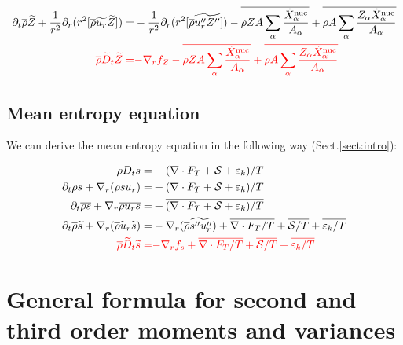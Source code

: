 \documentclass[10pt,paper=a4]{report}
\newcommand{\eht}{\overline}
\newcommand{\fht}{\widetilde}
\begin{document}
\begin{align}
\partial_t \overline{\rho} \fht{Z}  +\frac{1}{r^{2}} \partial_{r}(r^{2} [\eht{\rho} \fht{u_{r}} \fht{Z}]) = & -\frac{1}{r^{2}} \partial_{r}(r^{2} [\eht{\rho} \fht{u''_{r} Z''}]) -\eht{\rho Z A \sum_\alpha \frac{\dot{X}_\alpha^{\rm nuc}}{A_\alpha}} + \eht{\rho A \sum_\alpha \frac{Z_\alpha \dot{X}_\alpha^{\rm nuc}}{A_\alpha}} \\
{\color{red} \eht{\rho}\fht{D}_t \fht{Z} =} & {\color{red} -\nabla_r f_Z -\eht{\rho Z A \sum_\alpha \frac{\dot{X}_\alpha^{\rm nuc}}{A_\alpha}} + \eht{\rho A \sum_\alpha \frac{Z_\alpha \dot{X}_\alpha^{\rm nuc}}{A_\alpha}}}
\end{align}

\fontsize{12pt}{20pt}

\subsection{Mean entropy equation}

We can derive the mean entropy equation in the following way (Sect.\ref{sect:intro}):

\fontsize{9pt}{20pt}

\begin{align}
\rho D_t s = & +(\nabla \cdot F_T + {\mathcal S} + \varepsilon_k)/T \\
\partial_t \rho s + \nabla_r (\rho s u_r) =  & +(\nabla \cdot F_T + {\mathcal S} + \varepsilon_k)/T \\
\partial_t \eht{\rho s} + \nabla_r \eht{\rho u_r s} = & +\eht{(\nabla \cdot F_T + {\mathcal S} + \varepsilon_k)/T} \\
\partial_t \eht{\rho}\fht{s} + \nabla_r (\eht{\rho} \fht{u}_r \fht{s}) = & -\nabla_r (\eht{\rho} \fht{s''u''_r}) + \eht{\nabla \cdot F_T / T} + \eht{{\mathcal S}/T} + \eht{{\varepsilon_k}/T} \\
{\color{red} \eht{\rho} \fht{D}_t \fht{s} =} & {\color{red}-\nabla_r f_s + \eht{\nabla \cdot F_T / T} + \eht{{\mathcal S}/T} + \eht{{\varepsilon_k}/T} }
\end{align}

\fontsize{12pt}{20pt}

\newpage

\section{General formula for second and third order moments and variances}
\end{document}
